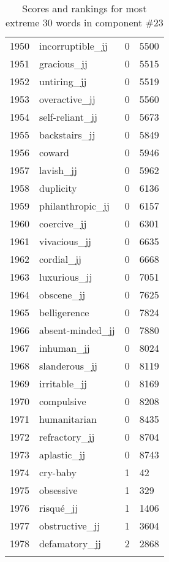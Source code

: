 \begin{longtable}[!htbp]{| rlr@{.}l |}
    1950 & incorruptible\_jj & 0 & 5500 \\
    1951 & gracious\_jj & 0 & 5515 \\
    1952 & untiring\_jj & 0 & 5519 \\
    1953 & overactive\_jj & 0 & 5560 \\
    1954 & self-reliant\_jj & 0 & 5673 \\
    1955 & backstairs\_jj & 0 & 5849 \\
    1956 & coward & 0 & 5946 \\
    1957 & lavish\_jj & 0 & 5962 \\
    1958 & duplicity & 0 & 6136 \\
    1959 & philanthropic\_jj & 0 & 6157 \\
    1960 & coercive\_jj & 0 & 6301 \\
    1961 & vivacious\_jj & 0 & 6635 \\
    1962 & cordial\_jj & 0 & 6668 \\
    1963 & luxurious\_jj & 0 & 7051 \\
    1964 & obscene\_jj & 0 & 7625 \\
    1965 & belligerence & 0 & 7824 \\
    1966 & absent-minded\_jj & 0 & 7880 \\
    1967 & inhuman\_jj & 0 & 8024 \\
    1968 & slanderous\_jj & 0 & 8119 \\
    1969 & irritable\_jj & 0 & 8169 \\
    1970 & compulsive & 0 & 8208 \\
    1971 & humanitarian & 0 & 8435 \\
    1972 & refractory\_jj & 0 & 8704 \\
    1973 & aplastic\_jj & 0 & 8743 \\
    1974 & cry-baby & 1 & 42 \\
    1975 & obsessive & 1 & 329 \\
    1976 & risqué\_jj & 1 & 1406 \\
    1977 & obstructive\_jj & 1 & 3604 \\
    1978 & defamatory\_jj & 2 & 2868 \\
    \hline
    \caption{Scores and rankings for most extreme 30 words in component \#23} \\
\end{longtable}
